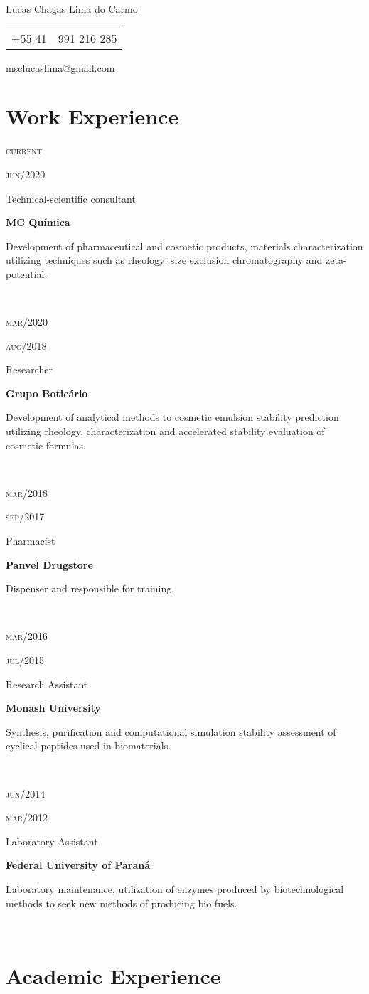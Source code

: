 \documentclass[a4paper, 12pt]{article}
\newcommand{\entry}[5]{
	\begin{minipage}[t]{.1\textwidth}
		\begin{flushright}
			\hfill
			{\textsc{#1}}

			{\textsc{#2}}
		\end{flushright}
	\end{minipage}
	\hfill\textcolor{Accent}{\vline}\hfill
	\begin{minipage}[t]{.80\textwidth}

		#3
		
		\textcolor{Accent}{\textbf{#4}}
		
		\footnotesize{#5}

	\end{minipage} \\ \vspace{.5cm}

}
\begin{document}

\pagestyle{fancy} %
\fancyhf{} 
\renewcommand{\headrulewidth}{0pt}

\thispagestyle{empty}
\begin{center}
	{\huge Lucas Chagas Lima do Carmo}
	
	\vspace{6pt}
	
	\begin{tabular}{c|l}
		\arrayrulecolor{Accent}
		+55 41 & 991 216 285
	\end{tabular}
	
	\vspace{6pt}
	
	\textcolor{Accent}{\underline{\href{mailto:msclucaslima@gmail.com}{msclucaslima@gmail.com}}}
	
	\vspace{12pt}
\end{center}





\section{Work Experience}

\entry{current}{jun/2020}
{Technical-scientific consultant}
{MC Química}
{Development of pharmaceutical and cosmetic products, 
materials characterization utilizing techniques such as rheology;
size exclusion chromatography and zeta-potential.}

\entry{mar/2020}{aug/2018}
{Researcher}
{Grupo Boticário}
{Development of analytical methods to cosmetic emulsion 
stability prediction utilizing rheology,
characterization and accelerated stability evaluation 
of cosmetic formulas.}

\entry{mar/2018}{sep/2017}
{Pharmacist}
{Panvel Drugstore}
{Dispenser and responsible for training.}

\entry{mar/2016}{jul/2015}
{Research Assistant}
{Monash University}
{Synthesis, purification and computational simulation stability assessment
of cyclical peptides used in biomaterials.}

\entry{jun/2014}{mar/2012}
{Laboratory Assistant}
{Federal University of Paraná}
{Laboratory maintenance, 
utilization of enzymes produced by biotechnological methods
to seek new methods of producing bio fuels.}

\section{Academic Experience}
\end{document}

